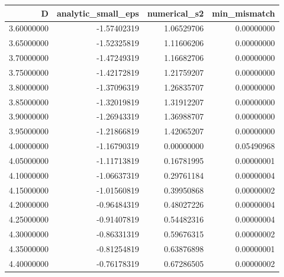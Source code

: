 \begin{tabular}{rrrr}
\toprule
D & analytic_small_eps & numerical_s2 & min_mismatch \\
\midrule
3.60000000 & -1.57402319 & 1.06529706 & 0.00000000 \\
3.65000000 & -1.52325819 & 1.11606206 & 0.00000000 \\
3.70000000 & -1.47249319 & 1.16682706 & 0.00000000 \\
3.75000000 & -1.42172819 & 1.21759207 & 0.00000000 \\
3.80000000 & -1.37096319 & 1.26835707 & 0.00000000 \\
3.85000000 & -1.32019819 & 1.31912207 & 0.00000000 \\
3.90000000 & -1.26943319 & 1.36988707 & 0.00000000 \\
3.95000000 & -1.21866819 & 1.42065207 & 0.00000000 \\
4.00000000 & -1.16790319 & 0.00000000 & 0.05490968 \\
4.05000000 & -1.11713819 & 0.16781995 & 0.00000001 \\
4.10000000 & -1.06637319 & 0.29761184 & 0.00000004 \\
4.15000000 & -1.01560819 & 0.39950868 & 0.00000002 \\
4.20000000 & -0.96484319 & 0.48027226 & 0.00000004 \\
4.25000000 & -0.91407819 & 0.54482316 & 0.00000004 \\
4.30000000 & -0.86331319 & 0.59676315 & 0.00000002 \\
4.35000000 & -0.81254819 & 0.63876898 & 0.00000001 \\
4.40000000 & -0.76178319 & 0.67286505 & 0.00000002 \\
\bottomrule
\end{tabular}
